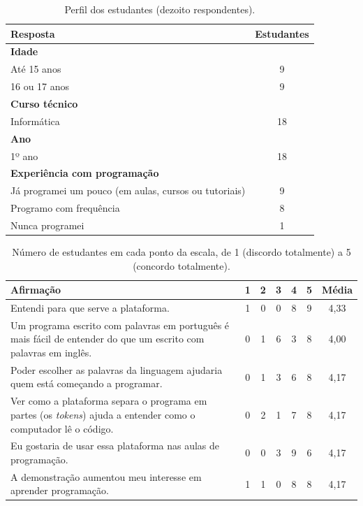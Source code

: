 \begin{table}[htbp]
\centering
\caption{Perfil dos estudantes (dezoito respondentes).}
\label{tab:ap-estudantes-perfil}
\footnotesize
\renewcommand{\arraystretch}{1.2}
\begin{tabular}{|p{10.5cm}|c|}
\hline
\textbf{Resposta} & \textbf{Estudantes} \\\hline
\multicolumn{2}{|l|}{\textbf{Idade}} \\\hline
Até 15 anos & 9 \\\hline
16 ou 17 anos & 9 \\\hline
\multicolumn{2}{|l|}{\textbf{Curso técnico}} \\\hline
Informática & 18 \\\hline
\multicolumn{2}{|l|}{\textbf{Ano}} \\\hline
1º ano & 18 \\\hline
\multicolumn{2}{|l|}{\textbf{Experiência com programação}} \\\hline
Já programei um pouco (em aulas, cursos ou tutoriais) & 9 \\\hline
Programo com frequência & 8 \\\hline
Nunca programei & 1 \\\hline
\end{tabular}
\end{table}

\begin{table}[htbp]
\centering
\caption{Número de estudantes em cada ponto da escala, de 1 (discordo totalmente) a 5 (concordo totalmente).}
\label{tab:ap-estudantes-dist}
\footnotesize
\renewcommand{\arraystretch}{1.2}
\begin{tabular}{|p{7.4cm}|c|c|c|c|c|c|}
\hline
\textbf{Afirmação} & \textbf{1} & \textbf{2} & \textbf{3} & \textbf{4} & \textbf{5} & \textbf{Média} \\\hline
Entendi para que serve a plataforma. & 1 & 0 & 0 & 8 & 9 & 4,33 \\\hline
Um programa escrito com palavras em português é mais fácil de entender do que um escrito com palavras em inglês. & 0 & 1 & 6 & 3 & 8 & 4,00 \\\hline
Poder escolher as palavras da linguagem ajudaria quem está começando a programar. & 0 & 1 & 3 & 6 & 8 & 4,17 \\\hline
Ver como a plataforma separa o programa em partes (os \textit{tokens}) ajuda a entender como o computador lê o código. & 0 & 2 & 1 & 7 & 8 & 4,17 \\\hline
Eu gostaria de usar essa plataforma nas aulas de programação. & 0 & 0 & 3 & 9 & 6 & 4,17 \\\hline
A demonstração aumentou meu interesse em aprender programação. & 1 & 1 & 0 & 8 & 8 & 4,17 \\\hline
\end{tabular}
\end{table}

